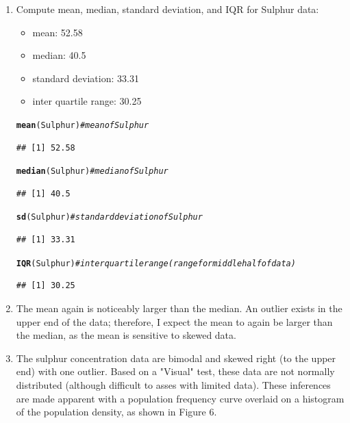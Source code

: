 \documentclass{article}\usepackage[]{graphicx}\usepackage[]{color}
\makeatletter
\newcommand{\hlcom}[1]{\textcolor[rgb]{0.678,0.584,0.686}{\textit{#1}}}%
\newcommand{\hlstd}[1]{\textcolor[rgb]{0.345,0.345,0.345}{#1}}%
\newcommand{\hlkwd}[1]{\textcolor[rgb]{0.737,0.353,0.396}{\textbf{#1}}}%
\newenvironment{kframe}{%
 \def\at@end@of@kframe{}%
 \ifinner\ifhmode%
  \def\at@end@of@kframe{\end{minipage}}%
  \begin{minipage}{\columnwidth}%
 \fi\fi%
 \def\FrameCommand##1{\hskip\@totalleftmargin \hskip-\fboxsep
 \colorbox{shadecolor}{##1}\hskip-\fboxsep
     \hskip-\linewidth \hskip-\@totalleftmargin \hskip\columnwidth}%
 \MakeFramed {\advance\hsize-\width
   \@totalleftmargin\z@ \linewidth\hsize
   \@setminipage}}%
 {\par\unskip\endMakeFramed%
 \at@end@of@kframe}
\newenvironment{knitrout}{}{} %
\makeatother
\begin{document}
\begin{enumerate}
\begin{enumerate}
      \item Compute mean, median, standard deviation, and IQR for Sulphur data:
        \begin{itemize}
          \item mean: 52.58
          \item median:  40.5
          \item standard deviation:  33.31
          \item inter quartile range:  30.25
        \end{itemize}
\begin{knitrout}
\color{fgcolor}\begin{kframe}
\begin{alltt}
\hlkwd{mean}\hlstd{(Sulphur)}    \hlcom{# mean of Sulphur}
\end{alltt}
\begin{verbatim}
## [1] 52.58
\end{verbatim}
\begin{alltt}
\hlkwd{median}\hlstd{(Sulphur)}  \hlcom{# median of Sulphur}
\end{alltt}
\begin{verbatim}
## [1] 40.5
\end{verbatim}
\begin{alltt}
\hlkwd{sd}\hlstd{(Sulphur)}      \hlcom{# standard deviation of Sulphur}
\end{alltt}
\begin{verbatim}
## [1] 33.31
\end{verbatim}
\begin{alltt}
\hlkwd{IQR}\hlstd{(Sulphur)}     \hlcom{# inter quartile range (range for middle half of data)}
\end{alltt}
\begin{verbatim}
## [1] 30.25
\end{verbatim}
\end{kframe}
\end{knitrout}

      \item The mean again is noticeably larger than the median.  An outlier
      exists in the upper end of the data; therefore, I expect the mean to again
      be larger than the median, as the mean is sensitive to skewed data.

      \item The sulphur concentration data are bimodal and skewed right (to the upper end)
        with one outlier.  Based on a "Visual" test, these data are not normally
        distributed (although difficult to asses with limited data).
        These inferences are made apparent with a population frequency curve overlaid
        on a histogram of the population density, as shown in Figure 6.




\end{enumerate}
\end{enumerate}
\end{document}
